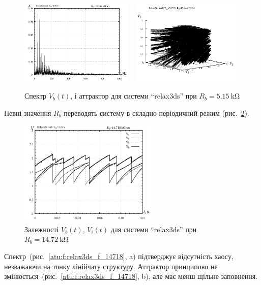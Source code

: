 \begin{figure}[htb!]
  \centerline{
    \includegraphics[width=0.48\textwidth]{p/relax3ds_f_013246.png}
    ~
    \includegraphics[width=0.48\textwidth]{p/relax3ds_v1v2v3_013246.png}
  }
  \caption{Спектр $V_b(t)$, і аттрактор для системи ``relax3ds'' при $R_b=\SI{5.15}{\kilo \ohm} $}
  \label{atu:f:relax3ds_f_13246}
\end{figure}

Певні значення
$R_b$ переводять систему в складно-періодичний режим (рис.~\ref{atu:f:relax3ds_t_14718}).

\begin{figure}[htb!]
  \centerline{\includegraphics[width=0.6\textwidth]{p/relax3ds_t_014718.png} }
  \caption{Залежності $V_b(t)$, $V_i(t)$ для системи ``relax3ds'' при $R_b=\SI{14.72}{\kilo\ohm} $}
  \label{atu:f:relax3ds_t_14718}
\end{figure}

Спектр~(рис.~\ref{atu:f:relax3ds_f_14718}, a) підтверджує відсутність хаосу,
незважаючи на тонку лінійчату структуру. Аттрактор принципово
не змінюється~(рис.~\ref{atu:f:relax3ds_f_14718}, b), але має менш щільне
заповнення.

